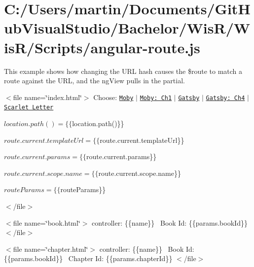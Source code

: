 \hypertarget{_c_1_2_users_2martin_2_documents_2_git_hub_visual_studio_2_bachelor_2_wis_r_2_wis_r_2_scripts_2angular-route_8js-example}{}\section{C\+:/\+Users/martin/\+Documents/\+Git\+Hub\+Visual\+Studio/\+Bachelor/\+Wis\+R/\+Wis\+R/\+Scripts/angular-\/route.\+js}
This example shows how changing the U\+R\+L hash causes the {\ttfamily \$route} to match a route against the U\+R\+L, and the {\ttfamily ng\+View} pulls in the partial.

$<$file name=\char`\"{}index.\+html\char`\"{}$>$  Choose\+: \href{Book/Moby}{\tt Moby} $\vert$ \href{Book/Moby/ch/1}{\tt Moby\+: Ch1} $\vert$ \href{Book/Gatsby}{\tt Gatsby} $\vert$ \href{Book/Gatsby/ch/4?key=value}{\tt Gatsby\+: Ch4} $\vert$ \href{Book/Scarlet}{\tt Scarlet Letter}~\newline


 

 



 
\begin{DoxyPre}$location.path() = \{\{$location.path()\}\}\end{DoxyPre}
 
\begin{DoxyPre}$route.current.templateUrl = \{\{$route.current.templateUrl\}\}\end{DoxyPre}
 
\begin{DoxyPre}$route.current.params = \{\{$route.current.params\}\}\end{DoxyPre}
 
\begin{DoxyPre}$route.current.scope.name = \{\{$route.current.scope.name\}\}\end{DoxyPre}
 
\begin{DoxyPre}$routeParams = \{\{$routeParams\}\}\end{DoxyPre}
  $<$/file$>$

$<$file name=\char`\"{}book.\+html\char`\"{}$>$ controller\+: \{\{name\}\}~\newline
 Book Id\+: \{\{params.\+book\+Id\}\}~\newline
 $<$/file$>$

$<$file name=\char`\"{}chapter.\+html\char`\"{}$>$ controller\+: \{\{name\}\}~\newline
 Book Id\+: \{\{params.\+book\+Id\}\}~\newline
 Chapter Id\+: \{\{params.\+chapter\+Id\}\} $<$/file$>$

